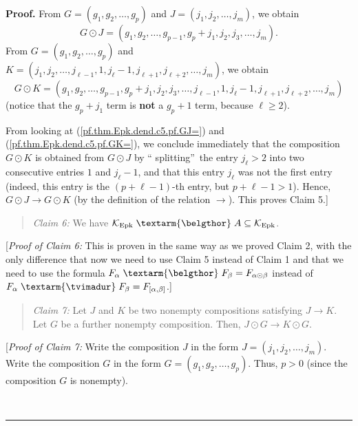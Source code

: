 \documentclass[numbers=enddot,12pt,final,onecolumn,notitlepage]{scrartcl}%
\theoremstyle{definition}
\newenvironment{statement}{\begin{quote}}{\end{quote}}
\newenvironment{proof}[1][Proof]{\noindent\textbf{#1.} }{\ \rule{0.5em}{0.5em}}
\newcommand{\tvi}{\left. \textarm{\tvimadur} \right.}
\newcommand{\bel}{\left. \textarm{\belgthor} \right.}
\begin{document}
\begin{proof}
From $G=\left(  g_{1},g_{2},\ldots,g_{p}\right)  $ and $J=\left(  j_{1}%
,j_{2},\ldots,j_{m}\right)  $, we obtain%
\begin{equation}
G\odot J=\left(  g_{1},g_{2},\ldots,g_{p-1},g_{p}+j_{1},j_{2},j_{3}%
,\ldots,j_{m}\right)  . \label{pf.thm.Epk.dend.c5.pf.GJ=}%
\end{equation}
From $G=\left(  g_{1},g_{2},\ldots,g_{p}\right)  $ and $K=\left(  j_{1}%
,j_{2},\ldots,j_{\ell-1},1,j_{\ell}-1,j_{\ell+1},j_{\ell+2},\ldots
,j_{m}\right)  $, we obtain%
\begin{equation}
G\odot K=\left(  g_{1},g_{2},\ldots,g_{p-1},g_{p}+j_{1},j_{2},j_{3}%
,\ldots,j_{\ell-1},1,j_{\ell}-1,j_{\ell+1},j_{\ell+2},\ldots,j_{m}\right)
\label{pf.thm.Epk.dend.c5.pf.GK=}%
\end{equation}
(notice that the $g_{p}+j_{1}$ term is \textbf{not} a $g_{p}+1$ term, because
$\ell\geq2$).

From looking at (\ref{pf.thm.Epk.dend.c5.pf.GJ=}) and
(\ref{pf.thm.Epk.dend.c5.pf.GK=}), we conclude immediately that the
composition $G\odot K$ is obtained from $G\odot J$ by \textquotedblleft
splitting\textquotedblright\ the entry $j_{\ell}>2$ into two consecutive
entries $1$ and $j_{\ell}-1$, and that this entry $j_{\ell}$ was not the first
entry (indeed, this entry is the $\left(  p+\ell-1\right)  $-th entry, but
$p+\ell-1>1$). Hence, $G\odot J\rightarrow G\odot K$ (by the definition of the
relation $\rightarrow$). This proves Claim 5.]

\begin{statement}
\textit{Claim 6:} We have $\mathcal{K}_{\operatorname*{Epk}}\bel  A\subseteq
\mathcal{K}_{\operatorname*{Epk}}$.
\end{statement}

[\textit{Proof of Claim 6:} This is proven in the same way as we proved Claim
2, with the only difference that now we need to use Claim 5 instead of Claim 1
and that we need to use the formula $F_{\alpha}\bel  F_{\beta}=F_{\alpha
\odot\beta}$ instead of $F_{\alpha}\tvi  F_{\beta}=F_{\left[  \alpha
,\beta\right]  }$.]

\begin{statement}
\textit{Claim 7:} Let $J$ and $K$ be two nonempty compositions satisfying
$J\rightarrow K$. Let $G$ be a further nonempty composition. Then, $J\odot
G\rightarrow K\odot G$.
\end{statement}

[\textit{Proof of Claim 7:} Write the composition $J$ in the form $J=\left(
j_{1},j_{2},\ldots,j_{m}\right)  $. Write the composition $G$ in the form
$G=\left(  g_{1},g_{2},\ldots,g_{p}\right)  $. Thus, $p>0$ (since the
composition $G$ is nonempty).


\end{proof}
\end{document}

